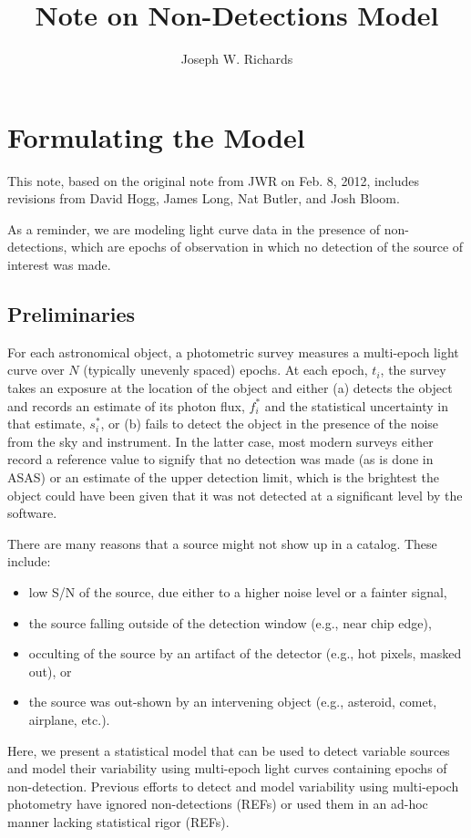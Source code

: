 \documentclass[12pt,preprint]{aastex}
\newcommand{\fobs}{f_i^*}
\newcommand{\sobs}{s_i^*}
\begin{document}

\shortauthors{}
\title{Note on Non-Detections Model}
\author{
Joseph W. Richards
}



\section{Formulating the Model}
\label{sec:model}

This note, based on the original note from JWR on Feb. 8, 2012, includes revisions from David Hogg, James Long, Nat Butler, and Josh Bloom.

As a reminder, we are modeling light curve data in the presence of non-detections, which are epochs of observation in which no detection of the source of interest was made.

\subsection{Preliminaries}
\label{ss:prelim}

For each astronomical object, a photometric survey measures a multi-epoch light curve over $N$ (typically unevenly spaced) epochs.  At each epoch, $t_i$, the survey takes an exposure at the location of the object and either (a) detects the object and records an estimate of its photon flux, $\fobs$ and the statistical uncertainty in that estimate, $\sobs$, or (b) fails to detect the object in the presence of the noise from the sky and instrument.  In the latter case, most modern surveys either record a reference value to signify that no detection was made (as is done in ASAS) or an estimate of the upper detection limit, which is the brightest the object could have been given that it was not detected at a significant level by the software.

There are many reasons that a source might not show up in a catalog.  These include:
\begin{itemize}
\item low S/N of the source, due either to a higher noise level or a fainter signal,
\item the source falling outside of the detection window (e.g., near chip edge),
\item occulting of the source by an artifact of the detector (e.g., hot pixels, masked out), or
\item the source was out-shown by an intervening object (e.g., asteroid, comet, airplane, etc.).
\end{itemize}
Here, we present a statistical model that can be used to detect variable sources and model their variability using multi-epoch light curves containing epochs of non-detection.  Previous efforts to detect and model variability using multi-epoch photometry have ignored non-detections (REFs) or used them in an ad-hoc manner lacking statistical rigor (REFs).
\end{document}
